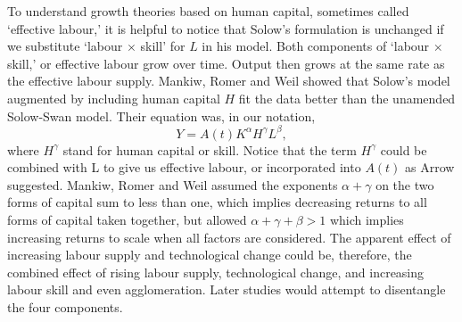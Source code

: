 To understand growth theories based on \gls{human capital},  sometimes called `\gls{effective labour},' it is helpful to notice that Solow's formulation is unchanged if we substitute `labour $\times$ skill' for $L$ in his model. Both components of `labour $\times$  skill,' or effective labour grow over time. Output then grows at the same rate as the effective labour supply. Mankiw, Romer and Weil \cite{mankiwContributionEmpiricsEconomic1992} showed that  
Solow's model augmented by including human capital $H$  fit the data better than the unamended Solow-Swan model. Their equation was, in our notation,   
\begin{equation*}
Y=A(t)K^\alpha H^\gamma L^\beta, 
\end{equation*}
where $H^\gamma$ stand for human capital or skill. Notice that the term $H^\gamma$ could be combined with L to give us effective labour, or incorporated into $A(t)$  as Arrow suggested. Mankiw, Romer and Weil assumed the exponents $\alpha+\gamma$ on the two forms of capital sum to less than one, which implies decreasing returns to all forms of capital taken together, but allowed $\alpha+\gamma +\beta > 1$ which implies increasing returns to scale when all factors are considered.  The apparent effect of increasing labour supply and technological change could be, therefore, the combined effect of rising labour supply, technological change, and increasing labour skill and even agglomeration. Later studies would attempt to disentangle the four components.




